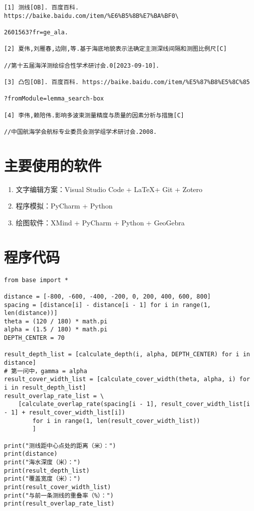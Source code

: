 

\begin{verbatim}
[1] 测线[OB]. 百度百科. https://baike.baidu.com/item/%E6%B5%8B%E7%BA%BF0\

2601563?fr=ge_ala.

[2] 夏伟,刘雁春,边刚,等.基于海底地貌表示法确定主测深线间隔和测图比例尺[C]

//第十五届海洋测绘综合性学术研讨会.0[2023-09-10].

[3] 凸包[OB]. 百度百科. https://baike.baidu.com/item/%E5%87%B8%E5%8C%85

?fromModule=lemma_search-box

[4] 李伟,赖陪伟.影响多波束测量精度与质量的因素分析与措施[C]

//中国航海学会航标专业委员会测学组学术研讨会.2008.

\end{verbatim}



\appendix
\section{主要使用的软件}

\begin{enumerate}
    \item 文字编辑方案：Visual Studio Code + \LaTeX + Git + Zotero
    \item 程序模拟：PyCharm + Python
    \item 绘图软件：XMind + PyCharm + Python + GeoGebra
\end{enumerate}

\section{程序代码}

\begin{lstlisting}[caption={question1.py}]
from base import *

distance = [-800, -600, -400, -200, 0, 200, 400, 600, 800]
spacing = [distance[i] - distance[i - 1] for i in range(1, len(distance))]
theta = (120 / 180) * math.pi
alpha = (1.5 / 180) * math.pi
DEPTH_CENTER = 70

result_depth_list = [calculate_depth(i, alpha, DEPTH_CENTER) for i in distance]
# 第一问中，gamma = alpha
result_cover_width_list = [calculate_cover_width(theta, alpha, i) for i in result_depth_list]
result_overlap_rate_list = \
    [calculate_overlap_rate(spacing[i - 1], result_cover_width_list[i - 1] + result_cover_width_list[i])
        for i in range(1, len(result_cover_width_list))
        ]

print("测线距中心点处的距离（米）：")
print(distance)
print("海水深度（米）：")
print(result_depth_list)
print("覆盖宽度（米）：")
print(result_cover_width_list)
print("与前一条测线的重叠率（%）：")
print(result_overlap_rate_list)
\end{lstlisting}

